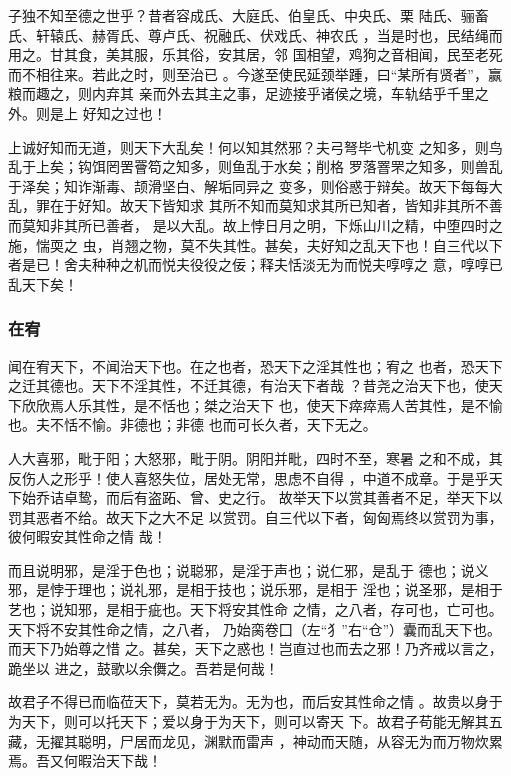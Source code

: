 \documentclass[]{article}
\begin{document}
子独不知至德之世乎？昔者容成氏、大庭氏、伯皇氏、中央氏、栗
陆氏、骊畜氏、轩辕氏、赫胥氏、尊卢氏、祝融氏、伏戏氏、神农氏
，当是时也，民结绳而用之。甘其食，美其服，乐其俗，安其居，邻
国相望，鸡狗之音相闻，民至老死而不相往来。若此之时，则至治已
。今遂至使民延颈举踵，曰``某所有贤者''，赢粮而趣之，则内弃其
亲而外去其主之事，足迹接乎诸侯之境，车轨结乎千里之外。则是上
好知之过也！

上诚好知而无道，则天下大乱矣！何以知其然邪？夫弓弩毕弋机变
之知多，则鸟乱于上矣；钩饵罔罟罾笱之知多，则鱼乱于水矣；削格
罗落罯罘之知多，则兽乱于泽矣；知诈渐毒、颉滑坚白、解垢同异之
变多，则俗惑于辩矣。故天下每每大乱，罪在于好知。故天下皆知求
其所不知而莫知求其所已知者，皆知非其所不善而莫知非其所已善者，
是以大乱。故上悖日月之明，下烁山川之精，中堕四时之施，惴耎之
虫，肖翘之物，莫不失其性。甚矣，夫好知之乱天下也！自三代以下
者是已！舍夫种种之机而悦夫役役之佞；释夫恬淡无为而悦夫啍啍之
意，啍啍已乱天下矣！

\hypertarget{header-n713}{%
\subsubsection{在宥}\label{header-n713}}

闻在宥天下，不闻治天下也。在之也者，恐天下之淫其性也；宥之
也者，恐天下之迁其德也。天下不淫其性，不迁其德，有治天下者哉
？昔尧之治天下也，使天下欣欣焉人乐其性，是不恬也；桀之治天下
也，使天下瘁瘁焉人苦其性，是不愉也。夫不恬不愉。非德也；非德
也而可长久者，天下无之。

人大喜邪，毗于阳；大怒邪，毗于阴。阴阳并毗，四时不至，寒暑
之和不成，其反伤人之形乎！使人喜怒失位，居处无常，思虑不自得
，中道不成章。于是乎天下始乔诘卓鸷，而后有盗跖、曾、史之行。
故举天下以赏其善者不足，举天下以罚其恶者不给。故天下之大不足
以赏罚。自三代以下者，匈匈焉终以赏罚为事，彼何暇安其性命之情 哉！

而且说明邪，是淫于色也；说聪邪，是淫于声也；说仁邪，是乱于
德也；说义邪，是悖于理也；说礼邪，是相于技也；说乐邪，是相于
淫也；说圣邪，是相于艺也；说知邪，是相于疵也。天下将安其性命
之情，之八者，存可也，亡可也。天下将不安其性命之情，之八者，
乃始脔卷囗（左``犭''右``仓''）囊而乱天下也。而天下乃始尊之惜
之。甚矣，天下之惑也！岂直过也而去之邪！乃齐戒以言之，跪坐以
进之，鼓歌以余儛之。吾若是何哉！

故君子不得已而临莅天下，莫若无为。无为也，而后安其性命之情
。故贵以身于为天下，则可以托天下；爱以身于为天下，则可以寄天
下。故君子苟能无解其五藏，无擢其聪明，尸居而龙见，渊默而雷声
，神动而天随，从容无为而万物炊累焉。吾又何暇治天下哉！
\end{document}
